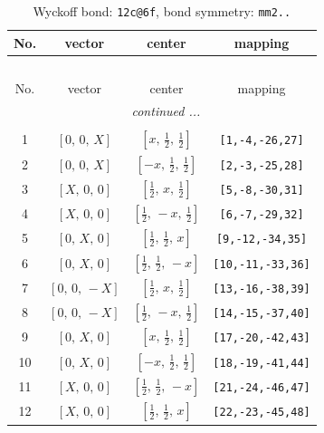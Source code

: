 \documentclass[fleqn,8pt]{jsarticle}
\begin{document}
\renewcommand{\arraystretch}{1.2}
\begin{longtable}{cccc}
\caption{Wyckoff bond: {\tt 12c@6f}, bond symmetry: {\tt mm2..}}
 \\
 \hline \hline
No. & vector & center & mapping \\ \hline \endfirsthead

\multicolumn{3}{l}{\tablename\ \thetable{}} \\
 \hline \hline
No. & vector & center & mapping \\ \hline \endhead

 \hline \hline
\multicolumn{3}{r}{\footnotesize\it continued ...} \\ \endfoot

 \hline \hline
\multicolumn{3}{r}{} \\ \endlastfoot

1 & $\left[ 0,\, 0,\, X \right]$ & $\left[ x,\, \frac{1}{2},\, \frac{1}{2} \right]$ & {\tt [1,-4,-26,27]} \\ \hline
2 & $\left[ 0,\, 0,\, X \right]$ & $\left[ - x,\, \frac{1}{2},\, \frac{1}{2} \right]$ & {\tt [2,-3,-25,28]} \\ \hline
3 & $\left[ X,\, 0,\, 0 \right]$ & $\left[ \frac{1}{2},\, x,\, \frac{1}{2} \right]$ & {\tt [5,-8,-30,31]} \\ \hline
4 & $\left[ X,\, 0,\, 0 \right]$ & $\left[ \frac{1}{2},\, - x,\, \frac{1}{2} \right]$ & {\tt [6,-7,-29,32]} \\ \hline
5 & $\left[ 0,\, X,\, 0 \right]$ & $\left[ \frac{1}{2},\, \frac{1}{2},\, x \right]$ & {\tt [9,-12,-34,35]} \\ \hline
6 & $\left[ 0,\, X,\, 0 \right]$ & $\left[ \frac{1}{2},\, \frac{1}{2},\, - x \right]$ & {\tt [10,-11,-33,36]} \\ \hline
7 & $\left[ 0,\, 0,\, - X \right]$ & $\left[ \frac{1}{2},\, x,\, \frac{1}{2} \right]$ & {\tt [13,-16,-38,39]} \\ \hline
8 & $\left[ 0,\, 0,\, - X \right]$ & $\left[ \frac{1}{2},\, - x,\, \frac{1}{2} \right]$ & {\tt [14,-15,-37,40]} \\ \hline
9 & $\left[ 0,\, X,\, 0 \right]$ & $\left[ x,\, \frac{1}{2},\, \frac{1}{2} \right]$ & {\tt [17,-20,-42,43]} \\ \hline
10 & $\left[ 0,\, X,\, 0 \right]$ & $\left[ - x,\, \frac{1}{2},\, \frac{1}{2} \right]$ & {\tt [18,-19,-41,44]} \\ \hline
11 & $\left[ X,\, 0,\, 0 \right]$ & $\left[ \frac{1}{2},\, \frac{1}{2},\, - x \right]$ & {\tt [21,-24,-46,47]} \\ \hline
12 & $\left[ X,\, 0,\, 0 \right]$ & $\left[ \frac{1}{2},\, \frac{1}{2},\, x \right]$ & {\tt [22,-23,-45,48]} \\
\end{longtable}
\end{document}
